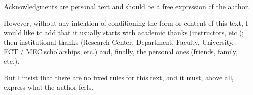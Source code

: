 
%

\begin{ntacknowledgements}

Acknowledgments are personal text and should be a free expression of the author.

However, without any intention of conditioning the form or content of this text, I would like to add that it usually starts with academic thanks (instructors, etc.); then institutional thanks (Research Center, Department, Faculty, University, FCT / MEC scholarships, etc.) and, finally, the personal ones (friends, family, etc.).

But I insist that there are no fixed rules for this text, and it must, above all, express what the author feels.

\end{ntacknowledgements}